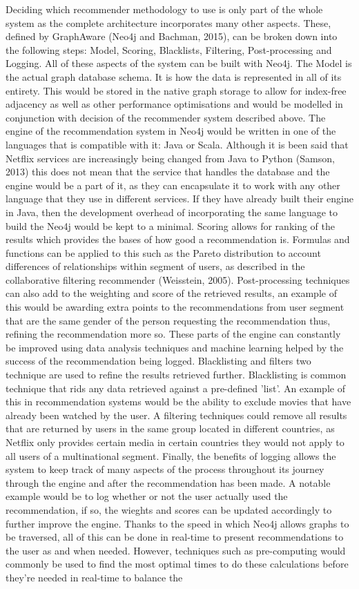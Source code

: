 \documentclass[a4paper]{article}
\begin{document}
Deciding which recommender methodology to use is only part of the whole system as the complete architecture incorporates many other aspects. These, defined by GraphAware (Neo4j and Bachman, 2015), can be broken down into the following steps: Model, Scoring, Blacklists, Filtering, Post-processing and Logging. All of these aspects of the system can be built with Neo4j. The Model is the actual graph database schema. It is how the data is represented in all of its entirety. This would be stored in the native graph storage to allow for index-free adjacency as well as other performance optimisations and would be modelled in conjunction with decision of the recommender system described above. The engine of the recommendation system in Neo4j would be written in one of the languages that is compatible with it: Java or Scala. Although it is been said that Netflix services are increasingly being changed from Java to Python (Samson, 2013) this does not mean that the service that handles the database and the engine would be a part of it, as they can encapsulate it to work with any other language that they use in different services. If they have already built their engine in Java, then the development overhead of incorporating the same language to build the Neo4j would be kept to a minimal. Scoring allows for ranking of the results which provides the bases of how good a recommendation is. Formulas and functions can be applied to this such as the Pareto distribution to account differences of relationships within segment of users, as described in the collaborative filtering recommender (Weisstein, 2005). Post-processing techniques can also add to the weighting and score of the retrieved results, an example of this would be awarding extra points to the recommendations from user segment that are the same gender of the person requesting the recommendation thus, refining the recommendation more so. These parts of the engine can constantly be improved using data analysis techniques and machine learning helped by the success of the recommendation being logged. Blacklisting and filters two technique are used to refine the results retrieved further. Blacklisting is common technique that rids any data retrieved against a pre-defined 'list'. An example of this in recommendation systems would be the ability to exclude movies that have already been watched by the user. A filtering techniques could remove all results that are returned by users in the same group located in different countries, as Netflix only provides certain media in certain countries they would not apply to all users of a multinational segment. Finally, the benefits of logging allows the system to keep track of many aspects of the process throughout its journey through the engine and after the recommendation has been made. A notable example would be to log whether or not the user actually used the recommendation, if so, the wieghts and scores can be updated accordingly to further improve the engine. Thanks to the speed in which Neo4j allows graphs to be traversed, all of this can be done in real-time to present recommendations to the user as and when needed. However, techniques such as pre-computing would commonly be used to find the most optimal times to do these calculations before they're needed in real-time to balance the 
\end{document}
